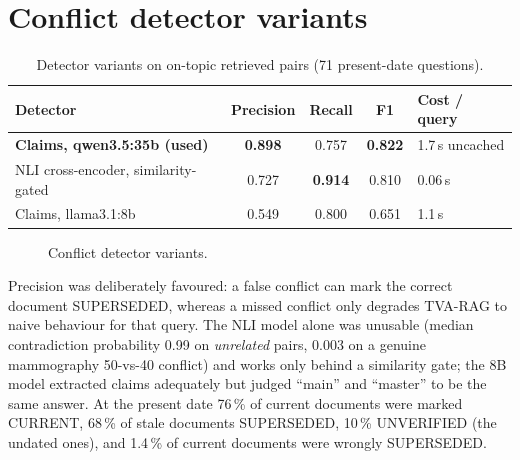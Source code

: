 \documentclass[11pt,a4paper]{report}
\begin{document}
\section{Conflict detector variants}
\begin{table}[htbp]\centering\caption{Detector variants on on-topic retrieved pairs (71 present-date questions).}\label{tab:det}\small
\begin{tabular}{l c c c l}\toprule\rowcolor{cIngest}\textbf{Detector}&\textbf{Precision}&\textbf{Recall}&\textbf{F1}&\textbf{Cost / query}\\\midrule
\rowcolor{cNew}\textbf{Claims, qwen3.5:35b (used)} & \textbf{0.898} & 0.757 & \textbf{0.822} & 1.7\,s uncached\\
NLI cross-encoder, similarity-gated & 0.727 & \textbf{0.914} & 0.810 & 0.06\,s\\
Claims, llama3.1:8b & 0.549 & 0.800 & 0.651 & 1.1\,s\\\bottomrule\end{tabular}\end{table}

\begin{figure}[htbp]\centering
{}
\caption{Conflict detector variants.}
\end{figure}

Precision was deliberately favoured: a false conflict can mark the correct document SUPERSEDED, whereas a missed conflict only degrades TVA-RAG to naive behaviour for that query. The NLI model alone was unusable (median contradiction probability 0.99 on \emph{unrelated} pairs, 0.003 on a genuine mammography 50-vs-40 conflict) and works only behind a similarity gate; the 8B model extracted claims adequately but judged ``main'' and ``master'' to be the same answer. At the present date 76\,\% of current documents were marked CURRENT, 68\,\% of stale documents SUPERSEDED, 10\,\% UNVERIFIED (the undated ones), and 1.4\,\% of current documents were wrongly SUPERSEDED.
\end{document}
